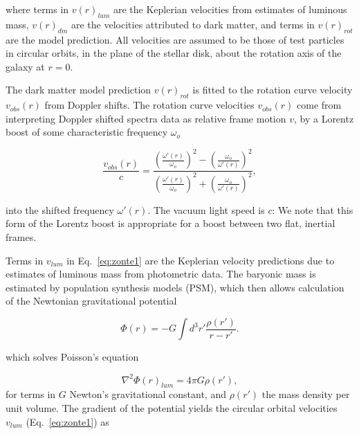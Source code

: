 \documentclass[reprint,%
 amsmath,amssymb,
 aps,
]{revtex4-1}
\begin{document}
  where terms in $v(r)_{lum}$ are the Keplerian velocities from estimates of   luminous mass,  $v(r)_{dm}$ are the velocities attributed to  dark matter, 
  and 
  terms in $v(r)_{rot} $ are the model  prediction.  All velocities are assumed to be those of test particles in circular orbits, in the plane of the stellar disk,  about the rotation axis of the galaxy at  $r=0$. 
  
  The dark matter model  prediction  $v(r)_{rot} $
  is fitted to the  rotation curve velocity  
  $v_{obs}(r)$ from Doppler shifts.  
 The   rotation curve velocities    $v_{obs}(r)$   come from interpreting Doppler shifted spectra data as relative frame motion $v$,    by a 
 Lorentz boost  of some characteristic frequency $\omega_o$


 \begin{equation}
 \frac{v_{obs}(r) }{c}=
\frac{  \left( \frac{\omega'(r)}{\omega_o}\right)^2 -  \left( \frac{\omega_o}{\omega'(r)} \right)^2 }{  \left( \frac{\omega'(r)}{\omega_o}\right)^2  +  \left( \frac{\omega_o}{\omega'(r)}\right)^2 }, 
\label{eq:modelLumA}
\end{equation} 

into the shifted frequency $\omega'(r)$. 
The  vacuum light speed is $c$: %
We note that this form of the Lorentz boost is appropriate for   a boost between two flat, inertial frames. 
  
  
Terms in $v_{lum}$ in Eq.~\ref{eq:zonte1} are the 
  Keplerian velocity predictions due to  estimates 
  of luminous mass 
     from photometric   data. The  baryonic  mass is estimated by    population synthesis models (PSM), which then allows calculation of the 
   Newtonian gravitational potential  
   
\begin{equation}
      \Phi(r)  = -G \int d^3r'  \frac{ \rho(r') }{r-r'}.
      \label{eq:Newt}
      \end{equation}
  
which solves Poisson's equation

\begin{equation}
\nabla^2 \Phi(r)_{lum}  = 4\pi G \rho(r'),     
    \label{whatsgood}
\end{equation}
for
   terms in  $G$      Newton's   gravitational constant, and 
$\rho(r')$  the mass density per unit volume. 
The gradient of the potential    yields the circular orbital velocities $v_{lum}$ (Eq.~\ref{eq:zonte1}) as
\end{document}
